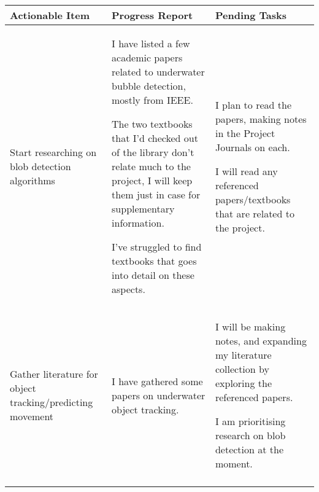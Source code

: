 \pagebreak
\begin{table}[!h]
    \centering
    \begin{tabularx}{\textwidth}{|X|X|X|}
        \hline
        Actionable Item & Progress Report & Pending Tasks \\
        \hline
        \hline
        \begin{myitemize}
            \item Start researching on blob detection algorithms
        \end{myitemize} & 
        \begin{myitemize}
            \item I have listed a few academic papers related to underwater bubble detection, mostly from IEEE.
            \item The two textbooks that I'd checked out of the library don't relate much to the project, I will keep them just in case for supplementary information.
            \item I've struggled to find textbooks that goes into detail on these aspects.
        \end{myitemize} & 
        \begin{myitemize}
            \item I plan to read the papers, making notes in the Project Journals on each.
            \item I will read any referenced papers/textbooks that are related to the project.
        \end{myitemize} \\
        \hline
        \begin{myitemize}
            \item Gather literature for object tracking/predicting movement
        \end{myitemize} & 
        \begin{myitemize}
            \item I have gathered some papers on underwater object tracking.
        \end{myitemize} & 
        \begin{myitemize}
            \item I will be making notes, and expanding my literature collection by exploring the referenced papers.
            \item I am prioritising research on blob detection at the moment.
        \end{myitemize} \\
        \hline
        \begin{myitemize}

\end{myitemize}
\end{tabularx}
\end{table}
